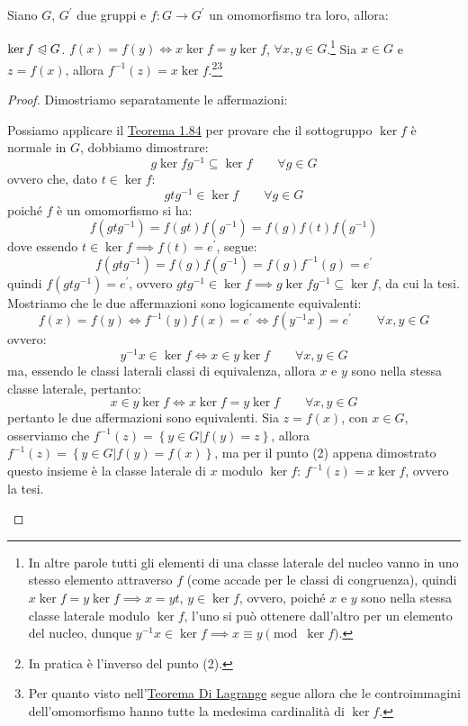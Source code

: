 \documentclass[11pt]{scrartcl}
\begin{document}
\begin{theorem}
\label{g:sgrnker}
Siano $G$, $G^{\prime}$ due gruppi e $f : G \longrightarrow G^{\prime}$ un omomorfismo tra loro, allora:
\begin{enumerate}[(1)]
	\ii $\ker f \trianglelefteqslant G$.
	\ii $f(x)=f(y) \iff x\ker f = y\ker f$, $\forall x,y \in G$.\footnote{In altre parole tutti gli elementi di una classe laterale del nucleo vanno in uno stesso elemento attraverso $f$ (come accade per le classi di congruenza), quindi $ x\ker f = y\ker f \implies x=yt$, $y \in \ker f$, ovvero, poiché $x$ e $y$ sono nella stessa classe laterale modulo $\ker f$, l'uno si può ottenere dall'altro per un elemento del nucleo, dunque $y^{-1}x \in \ker f \implies x \equiv y \pmod{\ker f}$.}
	\ii Sia $x \in G$ e $z=f(x)$, allora $f^{-1}(z)=x\ker f$.\footnote{In pratica è l'inverso del punto (2).}\footnote{Per quanto visto nell'\hyperref[g:Lagrange]{Teorema Di Lagrange} segue allora che le controimmagini dell'omomorfismo hanno tutte la medesima cardinalità di $\ker f$.}
\end{enumerate}
\end{theorem}

\begin{proof}
Dimostriamo separatamente le affermazioni:
\begin{enumerate}[(1)]
	\ii Possiamo applicare il \hyperref[g:sgrN]{Teorema 1.84} per provare che il sottogruppo $\ker f$ è normale in $G$, dobbiamo dimostrare:
		\[ g \ker f g^{-1} \subseteq \ker f
		\qquad
		\forall g \in G
		\]
ovvero che, dato $t \in \ker f$:
		\[ gtg^{-1} \in \ker f
		\qquad
		\forall g \in G
		\]
poiché $f$ è un omomorfismo si ha:
		\[ f(gtg^{-1}) = f(gt)f(g^{-1}) = f(g) f(t) f(g^{-1})
		\]
dove essendo $t \in \ker f \implies f(t)=e^{\prime}$, segue:
		\[ f(gtg^{-1}) = f(g) f(g^{-1}) = f(g) f^{-1}(g) = e^{\prime}
		\]
quindi $ f(gtg^{-1}) = e^{\prime}$, ovvero $gtg^{-1} \in \ker f \implies  g \ker f g^{-1} \subseteq \ker f$, da cui la tesi.
	\ii Mostriamo che le due affermazioni sono logicamente equivalenti:
		\[ f(x)=f(y) \iff f^{-1}(y)f(x)=e^{\prime} \iff f(y^{-1}x) = e^{\prime}
		\qquad
		\forall x,y \in G
		\]
ovvero:
		\[ y^{-1}x \in \ker f \iff x \in y\ker f
		\qquad
		\forall x,y \in G
		\]
ma, essendo le classi laterali classi di equivalenza, allora $x$ e $y$ sono nella stessa classe laterale, pertanto:
		\[ x \in y\ker f \iff x\ker f = y\ker f
		\qquad
		\forall x,y \in G
		\]
pertanto le due affermazioni sono equivalenti.
	\ii Sia $z=f(x)$, con $x \in G$, osserviamo che $f^{-1}(z)=\left\{y \in G | f(y)=z\right\}$, allora $f^{-1}(z)=\left\{y \in G | f(y)=f(x)\right\}$, ma per il punto (2) appena dimostrato questo insieme è la classe laterale di $x$ modulo $\ker f$: $f^{-1}(z) = x \ker f$, ovvero la tesi.
\end{enumerate}
\end{proof}
\end{document}
